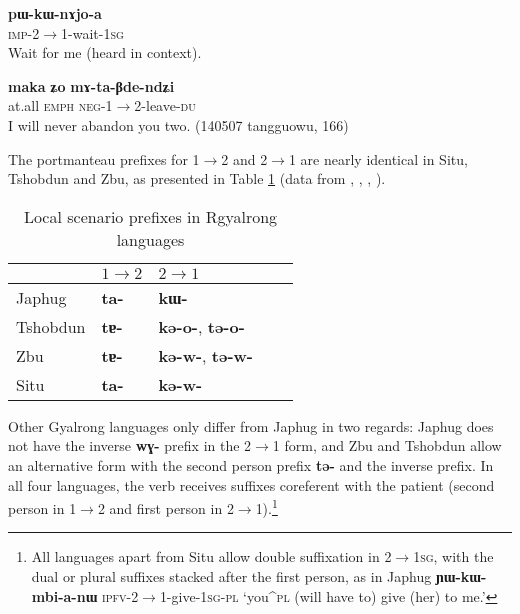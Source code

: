 \documentclass[oldfontcommands,oneside,a4paper,11pt]{article}
\newcommand{\ipa}[1]{\mbox{\phon\textbf{#1}}} %
\begin{document}
\begin{exe}
\ex \label{ex:2.1sg}
\gll \ipa{pɯ-kɯ-nɤjo-a} \\
\textsc{imp}-2$\rightarrow$1-wait-\textsc{1sg} \\
\glt Wait for me (heard in context).
\end{exe}

\begin{exe}
\ex \label{ex:1.2du}
\gll  \ipa{maka} 	\ipa{ʑo} 	\ipa{mɤ-ta-βde-ndʑi} \\
at.all \textsc{emph} \textsc{neg}-1$\rightarrow$2-leave-\textsc{du} \\
\glt I will never abandon you two. (140507 tangguowu, 166)
\end{exe}

The portmanteau prefixes for 1$\rightarrow$2 and 2$\rightarrow$1 are nearly identical in Situ, Tshobdun and Zbu, as presented in Table \ref{tab:local.rgy} (data from \citealt[218]{linxr93jiarong}, \citealt{jackson02rentongdengdi}, \citealt{jacques12agreement}, \citealt{gongxun14agreement}).

\begin{table}[H]
\caption{Local scenario prefixes in Rgyalrong languages} \centering \label{tab:local.rgy} 
\begin{tabular}{lllll}
\toprule
& $1\rightarrow2$ & $2\rightarrow1$ \\
\midrule
Japhug &  \ipa{ta-} & \ipa{kɯ-} \\
Tshobdun &  \ipa{tɐ-} & \ipa{kə-o-}, \ipa{tə-o-} \\
Zbu &  \ipa{tɐ-} &\ipa{kə-w-}, \ipa{tə-w-} \\
Situ &  \ipa{ta-} & \ipa{kə-w-} \\
\bottomrule
\end{tabular}
\end{table}

Other Gyalrong languages only differ from Japhug in two regards: Japhug does not have the inverse \ipa{wɣ-} prefix in the  2$\rightarrow$1 form, and Zbu and Tshobdun allow an alternative form with the second person prefix \ipa{tə-} and the inverse prefix. In all four languages, the verb receives suffixes coreferent with the patient (second person in 1$\rightarrow$2 and first person in  2$\rightarrow$1).\footnote{All languages apart from Situ allow double suffixation in 2$\rightarrow$\textsc{1sg}, with the dual or plural suffixes stacked after the first person, as in Japhug \ipa{ɲɯ-kɯ-mbi-a-nɯ} \textsc{ipfv}-2$\rightarrow$1-give-\textsc{1sg-pl} `you^{\textsc{pl}} (will have to) give (her) to me.'}
\end{document}
